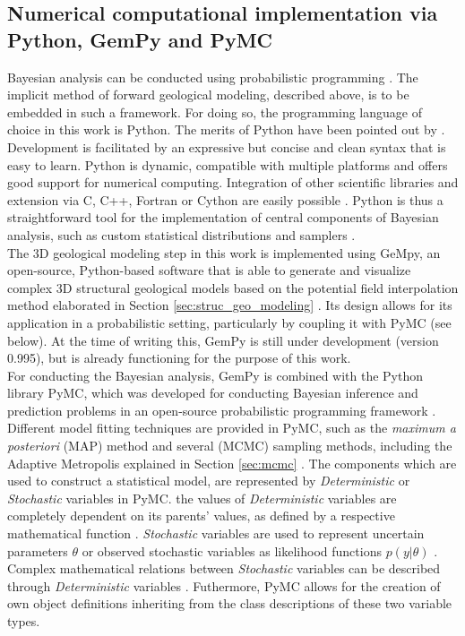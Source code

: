 		\subsection{Numerical computational implementation via Python, GemPy and PyMC}
		Bayesian analysis can be conducted using probabilistic programming \citep{salvatier2016pymc3}. The implicit method of forward geological modeling, described above, is to be embedded in such a framework. For doing so, the programming language of choice in this work is Python. The merits of Python have been pointed out by \citet{behnel2010, salvatier2016pymc3, Langtangen2008}. Development is facilitated by an expressive but concise and clean syntax that is easy to learn. Python is dynamic, compatible with multiple platforms and offers good support for numerical computing. Integration of other scientific libraries and extension via C, C++, Fortran or Cython are easily possible \citep{behnel2010, salvatier2016pymc3, Langtangen2008}. Python is thus a straightforward tool for the implementation of central components of Bayesian analysis, such as custom statistical distributions and samplers \citep{salvatier2016pymc3}.\\
		The 3D geological modeling step in this work is implemented using GeMpy, an open-source, Python-based software that is able to generate and visualize complex 3D structural geological models based on the potential field interpolation method elaborated in Section \ref{sec:struc_geo_modeling} \citet{delaVarga2017gempy}. Its design allows for its application in a probabilistic setting, particularly by coupling it with PyMC (see below). At the time of writing this, GemPy is still under development (version 0.995), but is already functioning for the purpose of this work.\\
		For conducting the Bayesian analysis, GemPy is combined with the Python library PyMC, which was developed for conducting Bayesian inference and prediction problems in an open-source probabilistic programming framework \citep{davidson2015, salvatier2016pymc3}. Different model fitting techniques are provided in PyMC, such as the \textit{maximum a posteriori} (MAP) method and several (MCMC) sampling methods, including the Adaptive Metropolis explained in Section \ref{sec:mcmc} \citep{salvatier2016pymc3}. The components which are used to construct a statistical model, are represented by \textit{Deterministic} or \textit{Stochastic} variables in PyMC. the values of \textit{Deterministic} variables are completely dependent on its parents' values, as defined by a respective mathematical function \citep{salvatier2016pymc3}. \textit{Stochastic} variables are used to represent uncertain parameters $\theta$ or observed stochastic variables as likelihood functions $p(y|\theta)$ \citep{salvatier2016pymc3, delaVarga2016}. Complex mathematical relations between \textit{Stochastic} variables can be described through \textit{Deterministic} variables \citep{delaVarga2016}. Futhermore, PyMC allows for the creation of own object definitions inheriting from the class descriptions of these two variable types.\\		
